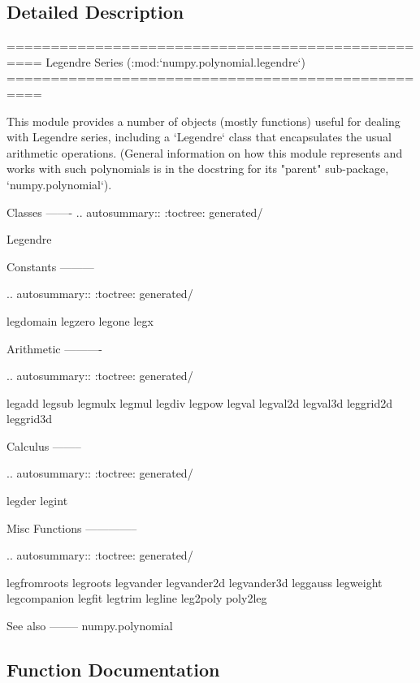 \subsection{Detailed Description}
\begin{DoxyVerb}==================================================
Legendre Series (:mod:`numpy.polynomial.legendre`)
==================================================

This module provides a number of objects (mostly functions) useful for
dealing with Legendre series, including a `Legendre` class that
encapsulates the usual arithmetic operations.  (General information
on how this module represents and works with such polynomials is in the
docstring for its "parent" sub-package, `numpy.polynomial`).

Classes
-------
.. autosummary::
   :toctree: generated/

Legendre

Constants
---------

.. autosummary::
   :toctree: generated/

   legdomain
   legzero
   legone
   legx

Arithmetic
----------

.. autosummary::
   :toctree: generated/

   legadd
   legsub
   legmulx
   legmul
   legdiv
   legpow
   legval
   legval2d
   legval3d
   leggrid2d
   leggrid3d

Calculus
--------

.. autosummary::
   :toctree: generated/

   legder
   legint

Misc Functions
--------------

.. autosummary::
   :toctree: generated/

   legfromroots
   legroots
   legvander
   legvander2d
   legvander3d
   leggauss
   legweight
   legcompanion
   legfit
   legtrim
   legline
   leg2poly
   poly2leg

See also
--------
numpy.polynomial\end{DoxyVerb}
 

\subsection{Function Documentation}
\mbox{\label{namespacenumpy_1_1polynomial_1_1legendre_aa88cb7adb4a3cc61a468ceafa8f18189}} 
